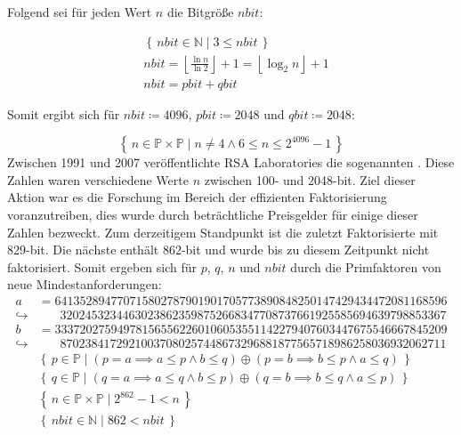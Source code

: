 Folgend sei für jeden Wert $n$ die Bitgröße $nbit$:

\begin{equation}
  \begin{split}
    &\left\{\,nbit \in \mathbb{N}\mid 3 \le nbit\, \right\}\\
    &nbit=\left\lfloor\frac{\ln{n}}{\ln{2}}\right\rfloor+1=\left\lfloor\log_2{n}\right\rfloor+1\\
    &nbit=pbit+qbit
  \end{split}
\end{equation}

Somit ergibt sich für $nbit\coloneq4096$, $pbit\coloneq2048$ und $qbit\coloneq2048$:

\begin{equation}
  \left\{\,n \in \mathbb{P} \times \mathbb{P}\mid n \ne 4 \land 6 \le n \le 2^{4096}-1\, \right\}
\end{equation}
\newpage
Zwischen 1991 und 2007 veröffentlichte RSA Laboratories die sogenannten . Diese Zahlen waren verschiedene Werte $n$ zwischen 100- und 2048-bit. Ziel dieser Aktion war es die Forschung im Bereich der effizienten Faktorisierung voranzutreiben, dies wurde durch beträchtliche Preisgelder für einige dieser Zahlen bezweckt. Zum derzeitigem Standpunkt ist  die zuletzt Faktorisierte  mit 829-bit\cite{rsa250}. Die nächste   enthält $862$-bit und wurde bis zu diesem Zeitpunkt nicht faktorisiert. Somit ergeben sich für $p$, $q$, $n$ und $nbit$ durch die Primfaktoren von  neue Mindestanforderungen:
\begin{equation}
  \begin{split}
    a&=641352894770715802787901901705773890848250147429434472081168596\\\hookrightarrow&\phantom{=}\;\,32024532344630238623598752668347708737661925585694639798853367\\
    b&=333720275949781565562260106053551142279407603447675546667845209\\\hookrightarrow&\phantom{=}\;\,87023841729210037080257448673296881877565718986258036932062711\\
    &\left\{\,p \in \mathbb{P}\mid (p=a \implies a \le p \land b \le q) \oplus (p=b \implies b \le p \land a \le q)\, \right\}\\
    &\left\{\,q \in \mathbb{P}\mid (q=a \implies a \le q \land b \le p) \oplus (q=b \implies b \le q \land a \le p)\, \right\}\\
    &\left\{\,n \in \mathbb{P} \times \mathbb{P}\mid 2^{862}-1 < n\, \right\}\\
    &\left\{\,nbit \in \mathbb{N}\mid 862 < nbit\, \right\}
  \end{split}
\end{equation}

